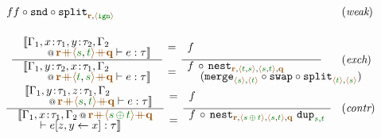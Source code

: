 \begin{figure*}[!t]
\begin{equation*}
\begin{array}{ll}
  {f}
  {f\circ\ident{snd}\circ \ident{split}_{\aclrd{\textbf{r}}, \alift{\czero}}}
& (\emph{weak})
\\[1.5em]
\hspace{0.5em}\mdeff
  {\begin{array}{l}\sem{\coctx{\Gamma_1,x\!:\!\tau_1,y\!:\!\tau_2,\Gamma_2\\[-0.25em]\qquad}
     {\aclrd{\textbf{r}} \atimes \alift{\cclrd{s},\cclrd{t}} \atimes \aclrd{\textbf{q}}} \vdash e : \tau}\end{array}}
  {\begin{array}{l}\sem{\coctx{\Gamma_1,y\!:\!\tau_2,x\!:\!\tau_1,\Gamma_2\\[-0.25em]\qquad}{\aclrd{\textbf{r}}
          \atimes \alift{\cclrd{t},\cclrd{s}} \atimes \aclrd{\textbf{q}}} \vdash e : \tau}\end{array}}
  {f}
  {\begin{array}{l}\hspace{-0.5em}f\,\circ\,\ident{nest}_{\aclrd{\textbf{r}}, \alift{\cclrd{t},\cclrd{s}},
     \alift{\cclrd{s},\cclrd{t}}, \aclrd{\textbf{q}}}\\[-0.25em]
     ~~(\ident{merge}_{\alift{\cclrd{s}}, \alift{\cclrd{t}}}\circ\ident{swap}\circ\ident{split}_{\alift{\cclrd{t}}, \alift{\cclrd{s}}})\hspace{-5em}~ \end{array} }
& (\emph{exch})
\\[1.5em]
\hspace{0em}\mdeff
  {\begin{array}{l}\sem{\coctx{\Gamma_1,y\!:\!\tau_1,z\!:\!\tau_1,\Gamma_2\\[-0.25em]\qquad}
      {\aclrd{\textbf{r}} \atimes \alift{\cclrd{s},\cclrd{t}} \atimes \aclrd{\textbf{q}}} \vdash e : \tau}\end{array}}
  {\begin{array}{l}\sem{\coctx{\Gamma_1,x\!:\!\tau_1,\Gamma_2}{\aclrd{\textbf{r}}
          \atimes \alift{\cclrd{s} \,\cpar\, \cclrd{t}} \atimes \aclrd{\textbf{q}}} \\[-0.25em] \qquad\vdash \subst{e}{z,y}{x} : \tau}\end{array}}
  {f}
  {\begin{array}{l}\hspace{-0.5em}f\,\circ\,\ident{nest}_{\aclrd{\textbf{r}}, \alift{\cclrd{s}\,\cpar\,\cclrd{t}},
      \alift{\cclrd{s},\cclrd{t}}, \aclrd{\textbf{q}}}~\ident{dup}_{\cclrd{s}, \cclrd{t}}\hspace{-0.5em} \\[-0.25em]~\end{array}}
& (\emph{contr})
\end{array}
\end{equation*}


\end{figure*}
